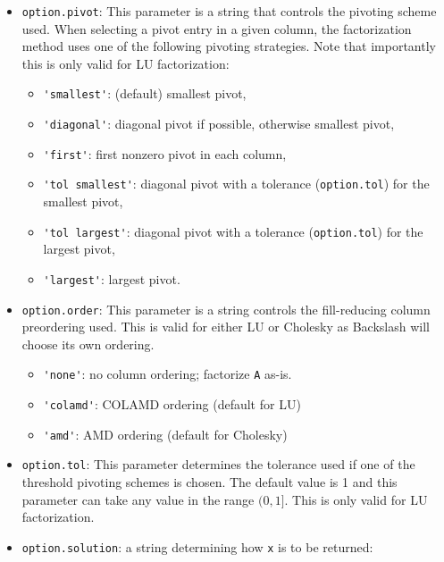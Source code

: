 \documentclass[12pt,oneside]{book}
\theoremstyle{definition}
\begin{document}
\begin{itemize}
\item \verb|option.pivot|: This parameter is a string that controls the
pivoting scheme used.  When selecting a pivot entry in a given column, the
factorization method uses one of the following pivoting strategies. Note that
importantly this is only valid for LU factorization:

    \begin{itemize}
    \item \verb|'smallest'|: (default) smallest pivot,
    \item \verb|'diagonal'|: diagonal pivot if possible, otherwise smallest pivot,
    \item \verb|'first'|: first nonzero pivot in each column,
    \item \verb|'tol smallest'|: diagonal pivot with a tolerance (\verb|option.tol|)
        for the smallest pivot,
    \item \verb|'tol largest'|: diagonal pivot with a tolerance (\verb|option.tol|)
        for the largest pivot,
    \item \verb|'largest'|: largest pivot.
    \end{itemize}
    
\item \verb|option.order|: This parameter is a string controls the
fill-reducing column preordering used. This is valid for either LU
or Cholesky as Backslash will choose its own ordering.

    \begin{itemize}
    \item \verb|'none'|: no column ordering; factorize \verb'A' as-is.
    \item \verb|'colamd'|: COLAMD ordering (default for LU)
    \item \verb|'amd'|: AMD ordering (default for Cholesky)
    \end{itemize}

\item \verb|option.tol|: This parameter determines the tolerance used if one of
the threshold pivoting schemes is chosen. The default value is 1 and this
parameter can take any value in the range $(0,1]$. This is only valid
for LU factorization.

\item \verb|option.solution|:
    a string determining how \verb|x| is to be returned:


\end{itemize}
\end{document}
